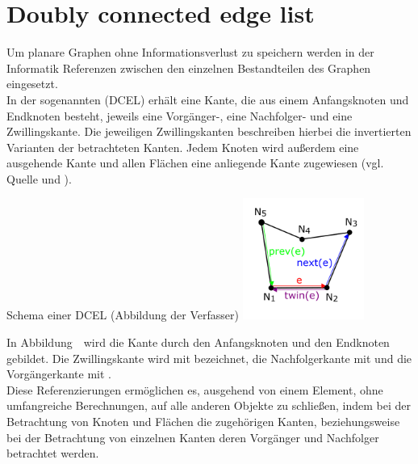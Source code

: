 \section{Doubly connected edge list}
Um planare Graphen ohne Informationsverlust zu speichern werden in der Informatik Referenzen zwischen den einzelnen Bestandteilen des Graphen eingesetzt. \\
In der sogenannten  (DCEL) erhält eine Kante, die aus einem Anfangsknoten und Endknoten besteht, jeweils eine Vorgänger-, eine Nachfolger- und eine Zwillingskante. 
Die jeweiligen Zwillingskanten beschreiben hierbei die invertierten Varianten der betrachteten Kanten.
Jedem Knoten wird außerdem eine ausgehende Kante und allen Flächen eine anliegende Kante zugewiesen (vgl. Quelle \cite{dcel} und \cite{dcelwiki}). \\
\begin{Bild}{Schema einer DCEL (Abbildung der Verfasser)}
	\includegraphics[width=150px]{Bilder/DCEL_Scheme}
\end{Bild}
In Abbildung~\thebildnr\ wird die Kante  durch den Anfangsknoten  und den Endknoten  gebildet.
Die Zwillingskante wird mit  bezeichnet, die Nachfolgerkante mit  und die Vorgängerkante mit . \\
Diese Referenzierungen ermöglichen es, ausgehend von einem Element, ohne umfangreiche Berechnungen, auf alle anderen Objekte zu schließen, indem bei der Betrachtung von Knoten und Flächen die zugehörigen Kanten, beziehungsweise bei der Betrachtung von einzelnen Kanten deren Vorgänger und Nachfolger betrachtet werden.


